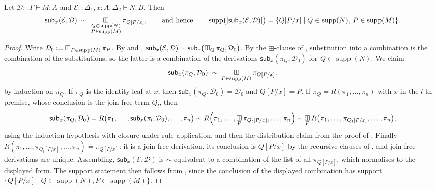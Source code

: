 \begin{lemma}
\label{lemma:subst_normal_form}
Let $\mathcal{D} :: \Gamma \vdash M : A$ and $\mathcal{E} :: \Delta_1, x : A, \Delta_2 \vdash N : B$.  Then
\[
\mathsf{sub}_x(\mathcal{E},\mathcal{D}) \;\sim\; \mathop{\boxplus}\displaylimits_{\substack{Q \in \operatorname{supp}(N)\\ P \in \operatorname{supp}(M)}} \pi_{Q[P/x]},
\qquad\text{and hence}\qquad
\operatorname{supp}\bigl(|\mathsf{sub}_x(\mathcal{E},\mathcal{D})|\bigr) = \{ Q[P/x] \mid Q \in \operatorname{supp}(N),\, P \in \operatorname{supp}(M) \}.
\]
\end{lemma}
\begin{proof}
Write $\mathcal{D}_0 \mathrel{\vcentcolon\mathrel{\mkern-1.2mu}=} \mathop{\boxplus}\displaylimits_{P \in \operatorname{supp}(M)} \pi_P$.
By  and ,
$\mathsf{sub}_x(\mathcal{E}, \mathcal{D}) \sim \mathsf{sub}_x\bigl(\mathop{\boxplus}\displaylimits_{Q} \pi_Q, \mathcal{D}_0\bigr)$.
By the $\boxplus$-clause of , substitution into a combination is the combination of the substitutions, so the latter is a combination of the derivations $\mathsf{sub}_x(\pi_Q, \mathcal{D}_0)$ for $Q \in \operatorname{supp}(N)$.
We claim
\[
\mathsf{sub}_x(\pi_Q, \mathcal{D}_0) \;\sim\; \mathop{\boxplus}\displaylimits_{P \in \operatorname{supp}(M)} \pi_{Q[P/x]},
\]
by induction on $\pi_Q$.
If $\pi_Q$ is the identity leaf at $x$, then $\mathsf{sub}_x(\pi_Q, \mathcal{D}_0) = \mathcal{D}_0$ and $Q[P/x] = P$.
If $\pi_Q = R(\pi_1, \ldots, \pi_n)$ with $x$ in the $l$-th premise, whose conclusion is the join-free term $Q_l$, then
\[
\mathsf{sub}_x(\pi_Q, \mathcal{D}_0) = R\bigl(\pi_1, \ldots, \mathsf{sub}_x(\pi_l, \mathcal{D}_0), \ldots, \pi_n\bigr)
\sim R\Bigl(\pi_1, \ldots, \mathop{\boxplus}\displaylimits_{P} \pi_{Q_l[P/x]}, \ldots, \pi_n\Bigr)
\sim \mathop{\boxplus}\displaylimits_{P} R\bigl(\pi_1, \ldots, \pi_{Q_l[P/x]}, \ldots, \pi_n\bigr),
\]
using the induction hypothesis with closure under rule application, and then the distribution claim from the proof of .
Finally $R(\pi_1, \ldots, \pi_{Q_l[P/x]}, \ldots, \pi_n) = \pi_{Q[P/x]}$: it is a join-free derivation, its conclusion is $Q[P/x]$ by the recursive clauses of , and join-free derivations are unique.
Assembling, $\mathsf{sub}_x(\mathcal{E},\mathcal{D})$ is $\sim$-equivalent to a combination of the list of all $\pi_{Q[P/x]}$, which  normalises to the displayed form.
The support statement then follows from , since the conclusion of the displayed combination has support $\{Q[P/x] \mid Q \in \operatorname{supp}(N), P \in \operatorname{supp}(M)\}$.
\end{proof}

